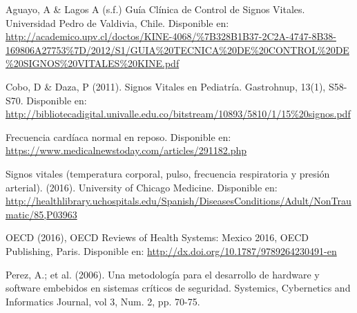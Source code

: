 \documentclass[journal]{IEEEtran}
\begin{document}
%
%
%
\begin{thebibliography}{1}


 Aguayo, A \& Lagos A (s.f.) Guía Clínica de Control de Signos Vitales. Universidad Pedro de Valdivia, Chile. Disponible en: \url{http://academico.upv.cl/doctos/KINE-4068/\%7B328B1B37-2C2A-4747-8B38-169806A27753%7D/2012/S1/GUIA%20TECNICA%20DE%20CONTROL%20DE%20SIGNOS%20VITALES%20KINE.pdf}
	
 Cobo, D \& Daza, P (2011). Signos Vitales en Pediatría. Gastrohnup, 13(1), S58-S70. Disponible en: \url{http://bibliotecadigital.univalle.edu.co/bitstream/10893/5810/1/15%20signos.pdf} 


 Frecuencia cardíaca normal en reposo. Disponible en: \url{https://www.medicalnewstoday.com/articles/291182.php}

 Signos vitales (temperatura corporal, pulso, frecuencia respiratoria y presión arterial). (2016). University of Chicago Medicine. Disponible en: \url{http://healthlibrary.uchospitals.edu/Spanish/DiseasesConditions/Adult/NonTraumatic/85,P03963}
	
 OECD (2016), OECD Reviews of Health Systems: Mexico 2016, OECD Publishing, Paris. Disponible en: \url{http://dx.doi.org/10.1787/9789264230491-en}

 Perez, A.; et al. (2006). Una metodología para el desarrollo de hardware y software embebidos en sistemas críticos de seguridad. Systemics, Cybernetics and Informatics Journal, vol 3, Num. 2, pp. 70-75.


\end{thebibliography}
\end{document}
